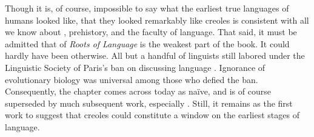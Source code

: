 Though it is, of course, impossible to say what the earliest true languages of humans looked like, that they looked remarkably like creoles is consistent with all we know about , prehistory, and the faculty of language. That said, it must be admitted that  of \textit{Roots of Language} is the weakest part of the book. It could hardly have been otherwise. All but a handful of linguists still labored under the Linguistic Society of Paris’s ban on discussing language . Ignorance of evolutionary biology was universal among those who defied the ban. Consequently, the chapter comes across today as naïve, and is of course superseded by much subsequent work, especially \citet{Bickerton2009,Bickerton2014}. Still, it remains as the first work to suggest that creoles could constitute a window on the earliest stages of language.